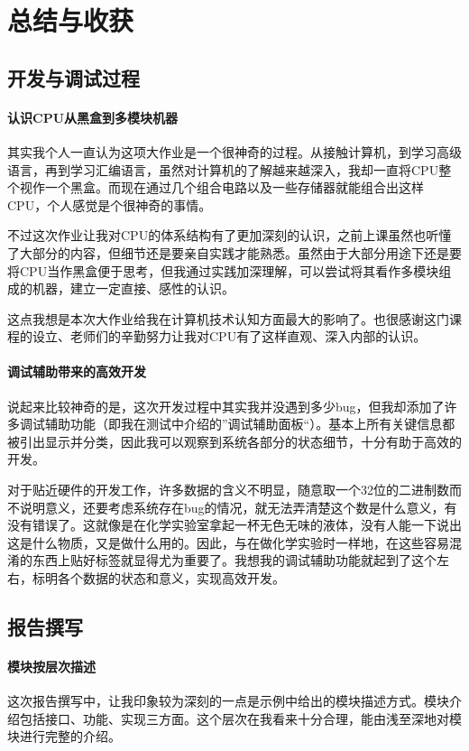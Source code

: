 \documentclass[main.tex]{subfiles}
\begin{document}
\section{总结与收获}

\subsection{开发与调试过程}

\paragraph{认识CPU从黑盒到多模块机器}
其实我个人一直认为这项大作业是一个很神奇的过程。从接触计算机，到学习高级语言，再到学习汇编语言，虽然对计算机的了解越来越深入，我却一直将CPU整个视作一个黑盒。而现在通过几个组合电路以及一些存储器就能组合出这样CPU，个人感觉是个很神奇的事情。

不过这次作业让我对CPU的体系结构有了更加深刻的认识，之前上课虽然也听懂了大部分的内容，但细节还是要亲自实践才能熟悉。虽然由于大部分用途下还是要将CPU当作黑盒便于思考，但我通过实践加深理解，可以尝试将其看作多模块组成的机器，建立一定直接、感性的认识。

这点我想是本次大作业给我在计算机技术认知方面最大的影响了。也很感谢这门课程的设立、老师们的辛勤努力让我对CPU有了这样直观、深入内部的认识。

\paragraph{调试辅助带来的高效开发}
说起来比较神奇的是，这次开发过程中其实我并没遇到多少bug，但我却添加了许多调试辅助功能（即我在测试中介绍的”调试辅助面板“）。基本上所有关键信息都被引出显示并分类，因此我可以观察到系统各部分的状态细节，十分有助于高效的开发。

对于贴近硬件的开发工作，许多数据的含义不明显，随意取一个32位的二进制数而不说明意义，还要考虑系统存在bug的情况，就无法弄清楚这个数是什么意义，有没有错误了。这就像是在化学实验室拿起一杯无色无味的液体，没有人能一下说出这是什么物质，又是做什么用的。因此，与在做化学实验时一样地，在这些容易混淆的东西上贴好标签就显得尤为重要了。我想我的调试辅助功能就起到了这个左右，标明各个数据的状态和意义，实现高效开发。

\subsection{报告撰写}

\paragraph{模块按层次描述}
这次报告撰写中，让我印象较为深刻的一点是示例中给出的模块描述方式。模块介绍包括接口、功能、实现三方面。这个层次在我看来十分合理，能由浅至深地对模块进行完整的介绍。
\end{document}
